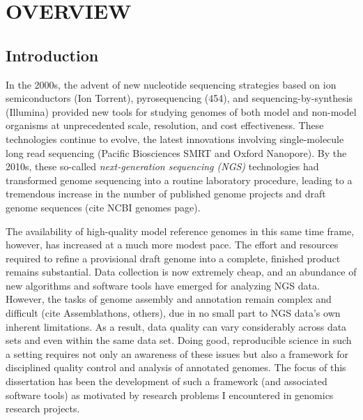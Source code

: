 \chapter{OVERVIEW}

\section{Introduction}

In the 2000s, the advent of new nucleotide sequencing strategies based on ion semiconductors (Ion Torrent), pyrosequencing (454), and sequencing-by-synthesis (Illumina) provided new tools for studying genomes of both model and non-model organisms at unprecedented scale, resolution, and cost effectiveness.
These technologies continue to evolve, the latest innovations involving single-molecule long read sequencing (Pacific Biosciences SMRT and Oxford Nanopore).
By the 2010s, these so-called \textit{next-generation sequencing (NGS)} technologies had transformed genome sequencing into a routine laboratory procedure, leading to a tremendous increase in the number of published genome projects and draft genome sequences (cite NCBI genomes page).

The availability of high-quality model reference genomes in this same time frame, however, has increased at a much more modest pace.
The effort and resources required to refine a provisional draft genome into a complete, finished product remains substantial.
Data collection is now extremely cheap, and an abundance of new algorithms and software tools have emerged for analyzing NGS data.
However, the tasks of genome assembly and annotation remain complex and difficult (cite Assemblathons, others), due in no small part to NGS data's own inherent limitations.
As a result, data quality can vary considerably across data sets and even within the same data set.
Doing good, reproducible science in such a setting requires not only an awareness of these issues but also a framework for disciplined quality control and analysis of annotated genomes.
The focus of this dissertation has been the development of such a framework (and associated software tools) as motivated by research problems I encountered in genomics research projects.

